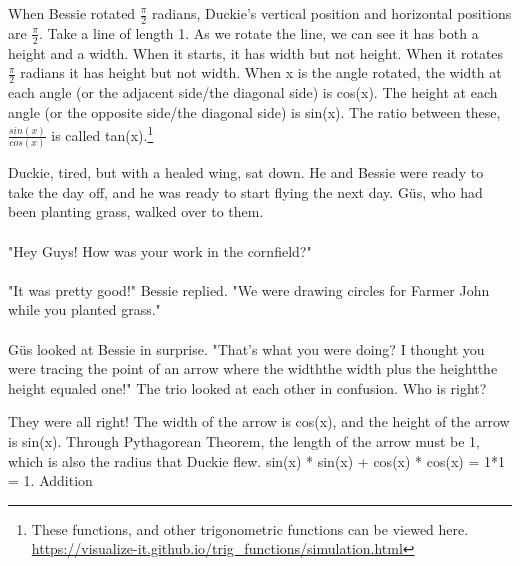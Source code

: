 {When Bessie rotated $\frac{\pi}{2}$ radians, Duckie's vertical position and horizontal positions are $\frac{\pi}{2}$.}
{Take a line of length 1. As we rotate the line, we can see it has both a height and a width. When it starts, it has width but not height. When it rotates $\frac{\pi}{2}$ radians it has height but not width. When x is the angle rotated, the width at each angle (or the adjacent side/the diagonal side) is cos(x). The height at each angle (or the opposite side/the diagonal side) is sin(x). The ratio between these, $\frac{sin(x)}{cos(x)}$ is called tan(x).\footnote{These functions, and other trigonometric functions can be viewed here. \url{https://visualize-it.github.io/trig_functions/simulation.html}}}
{}
{Duckie, tired, but with a healed wing, sat down. He and Bessie were ready to take the day off, and he was ready to start flying the next day. Güs, who had been planting grass, walked over to them. 
\paragraph{} "Hey Guys! How was your work in the cornfield?"
\paragraph{} "It was pretty good!" Bessie replied. "We were drawing circles for Farmer John while you planted grass."
\paragraph{} Güs looked at Bessie in surprise. "That's what you were doing? I thought you were tracing the point of an arrow where the width\texttimes the width plus the height\texttimes the height equaled one!"
The trio looked at each other in confusion. Who is right?}
{They were all right! The width of the arrow is cos(x), and the height of the arrow is sin(x). Through Pythagorean Theorem, the length of the arrow must be 1, which is also the radius that Duckie flew.}
{sin(x) * sin(x) + cos(x) * cos(x) = 1*1 = 1.}
{Addition}